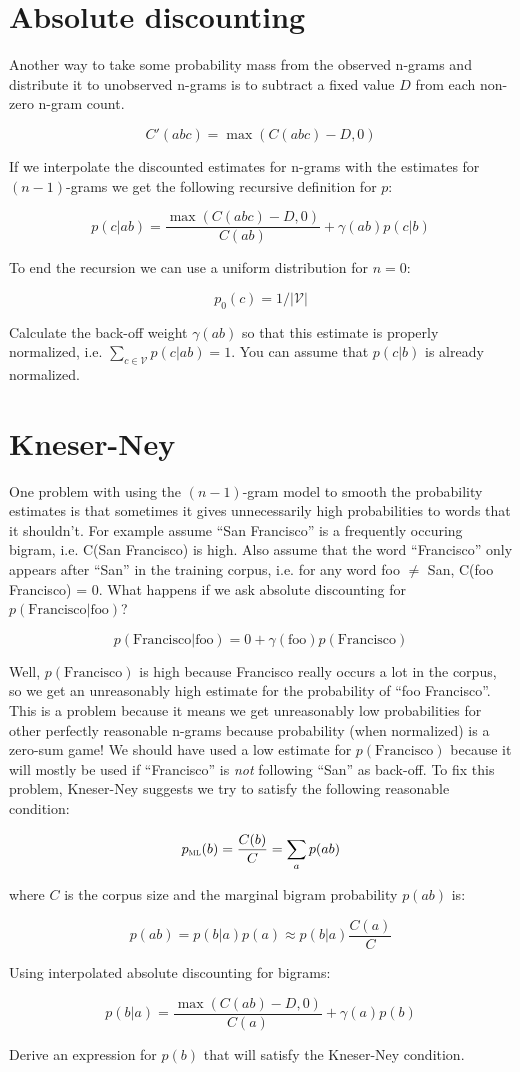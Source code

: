 \documentclass[a4paper]{article}
\newcommand{\vocab}{\mathcal{V}}
\newcommand{\pml}{p_{\textsc{ml}}}
\begin{document}
\newpage
\section{Absolute discounting}

Another way to take some probability mass from the observed n-grams
and distribute it to unobserved n-grams is to subtract a fixed value
$D$ from each non-zero n-gram count.

\[ C'(abc) = \max(C(abc) - D, 0) \]

If we interpolate the discounted estimates for n-grams with
the estimates for $(n-1)$-grams we get the following recursive
definition for $p$:

\[ p(c|ab) = \frac{\max(C(abc) - D, 0)}{C(ab)} + \gamma(ab) p(c|b) \]

To end the recursion we can use a uniform distribution for $n=0$:

\[ p_0(c)=1/|\vocab| \]

Calculate the back-off weight $\gamma(ab)$ so that this estimate is
properly normalized, i.e. $\sum_{c\in\vocab} p(c|ab) = 1$.  You can
assume that $p(c|b)$ is already normalized.


\newpage
\section{Kneser-Ney}

One problem with using the $(n-1)$-gram model to smooth the
probability estimates is that sometimes it gives unnecessarily high
probabilities to words that it shouldn't.  For example assume ``San
Francisco'' is a frequently occuring bigram, i.e. C(San Francisco) is
high.  Also assume that the word ``Francisco'' only appears after
``San'' in the training corpus, i.e. for any word foo $\neq$ San,
C(foo Francisco) = 0.  What happens if we ask absolute discounting for
$p(\mbox{Francisco} | \mbox{foo})$?

\[ p(\mbox{Francisco} | \mbox{foo}) = 0 + \gamma(\mbox{foo})
p(\mbox{Francisco}) \]

Well, $p(\mbox{Francisco})$ is high because Francisco really occurs a
lot in the corpus, so we get an unreasonably high estimate for the
probability of ``foo Francisco''.  This is a problem because it means
we get unreasonably low probabilities for other perfectly reasonable
n-grams because probability (when normalized) is a zero-sum game!  We
should have used a low estimate for $p(\mbox{Francisco})$ because it
will mostly be used if ``Francisco'' is {\em not} following ``San'' as
back-off.  To fix this problem, Kneser-Ney suggests we try to satisfy
the following reasonable condition:

\[ \pml(b) = \frac{C(b)}{C} = \sum_a p(ab) \]

where $C$ is the corpus size and the marginal bigram probability
$p(ab)$ is:

\[ p(ab) = p(b|a) p(a) \approx p(b|a) \frac{C(a)}{C} \]

Using interpolated absolute discounting for bigrams:

\[ p(b|a) = \frac{\max(C(ab) - D, 0)}{C(a)} + \gamma(a) p(b) \]

Derive an expression for $p(b)$ that will satisfy the Kneser-Ney
condition.
\end{document}
